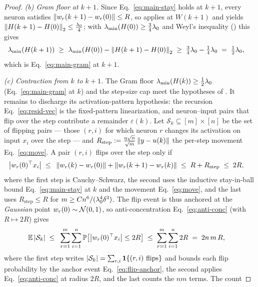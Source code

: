 \begin{proof}
\emph{(b) Gram floor at $k+1$.} Since Eq.~\eqref{eq:main-stay} holds at $k+1$, every neuron
satisfies $\left\| w_r(k+1) - w_r(0) \right\| \le R$, so  applies at $W(k+1)$
and yields $\left\| H(k+1) - H(0) \right\|_{2} \le \tfrac{\lambda_{0}}{4}$; with $\lambda_{\min}(H(0)) \ge \tfrac34\lambda_{0}$
and Weyl's inequality () this gives
\begin{align}\label{eq:gram-floor-kp1}
\lambda_{\min}\!\left( H(k+1) \right)
\;\ge\; & ~ \lambda_{\min}\!\left( H(0) \right) - \left\|  H(k+1) - H(0)  \right\|_{2}
\;\ge\; \tfrac34\lambda_{0} - \tfrac14\lambda_{0}
\;=\; \tfrac12\lambda_{0},
\end{align}
which is Eq.~\eqref{eq:main-gram} at $k+1$.

\emph{(c) Contraction from $k$ to $k+1$.} The Gram floor $\lambda_{\min}(H(k)) \ge \tfrac12\lambda_{0}$
(Eq.~\eqref{eq:main-gram} at $k$) and the step-size cap meet the hypotheses of
. It remains to discharge its activation-pattern hypothesis: the
recursion Eq.~\eqref{eq:resid-vec} is the fixed-pattern linearization, and neuron--input pairs
that flip over the step contribute a remainder $\varepsilon(k)$. Let
$\mathcal{S}_k \subseteq [m] \times [n]$ be the set of flipping pairs --- those $(r,i)$ for
which neuron $r$ changes its activation on input $x_i$ over the step --- and
$R_{\mathrm{step}} := \tfrac{\eta\sqrt n}{\sqrt m}\left\| y-u(k) \right\|$ the per-step
movement Eq.~\eqref{eq:move}. A pair $(r,i)$ flips over the step only if
\begin{align}\label{eq:flip-anchor}
\left| w_r(0)^\top x_i \right|
\;\le\; & ~ \left\| w_r(k) - w_r(0) \right\| + \left\| w_r(k+1) - w_r(k) \right\|
\;\le\; R + R_{\mathrm{step}}
\;\le\; 2R,
\end{align}
where the first step is Cauchy--Schwarz, the second uses the inductive stay-in-ball bound
Eq.~\eqref{eq:main-stay} at $k$ and the movement Eq.~\eqref{eq:move}, and the last uses
$R_{\mathrm{step}}\le R$ for $m\ge Cn^6/(\lambda_{0}^4\delta^3)$. The flip event is thus anchored at
the \emph{Gaussian} point $w_r(0)\sim\mathcal{N}(0,1)$, so anti-concentration Eq.~\eqref{eq:anti-conc}
(with $R\mapsto2R$) gives
\begin{align}\label{eq:flip-count}
\mathbb{E}\left| \mathcal{S}_k \right|
\;\le\; & ~ \sum_{r=1}^{m} \sum_{i=1}^{n} \mathbb{P}\!\left[ \left| w_r(0)^\top x_i \right| \le 2R \right]
\;\le\; \sum_{r=1}^{m} \sum_{i=1}^{n} 2R
\;=\; 2 n\, m\, R,
\end{align}
where the first step writes $\left| \mathcal{S}_k \right| = \sum_{r,i}\mathbf{1}\!\left\{(r,i)\text{ flips}\right\}$ and
bounds each flip probability by the anchor event Eq.~\eqref{eq:flip-anchor}, the second
applies Eq.~\eqref{eq:anti-conc} at radius $2R$, and the last counts the $nm$ terms. The count

\end{proof}

